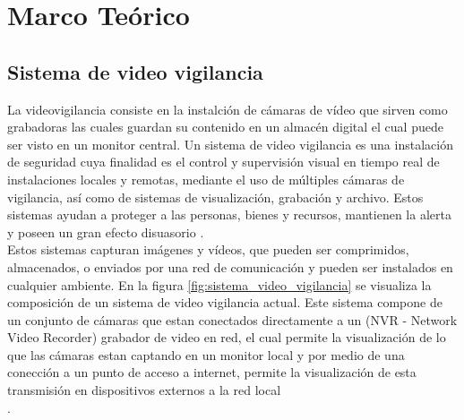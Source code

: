 \chapter{Marco Teórico}


\section{Sistema de video vigilancia}
La videovigilancia consiste en la instalción de cámaras de vídeo que sirven como grabadoras las cuales guardan su contenido en un almacén digital el cual puede ser visto en un monitor central. Un sistema de video vigilancia es una instalación de seguridad cuya finalidad es el control y supervisión visual en tiempo real de instalaciones locales y remotas, mediante el uso de múltiples cámaras de vigilancia, así como de sistemas de visualización, grabación y archivo. Estos sistemas ayudan a proteger a las personas, bienes y recursos, mantienen la alerta y poseen un gran efecto disuasorio \cite{wikipedia:vvigilancia}.\\

Estos sistemas capturan imágenes y vídeos, que pueden ser comprimidos, almacenados, o enviados por una red de comunicación y pueden ser instalados en cualquier ambiente. En la figura \ref{fig:sistema_video_vigilancia} se visualiza la composición de un sistema de video vigilancia actual. Este sistema compone de un conjunto de cámaras que estan conectados directamente a un (NVR - Network Video Recorder) grabador de video en red, el cual permite la visualización de lo que las cámaras estan captando en un monitor local y por medio de una conección a un punto de acceso a internet, permite la visualización de esta transmisión en dispositivos externos a la red local\\.

